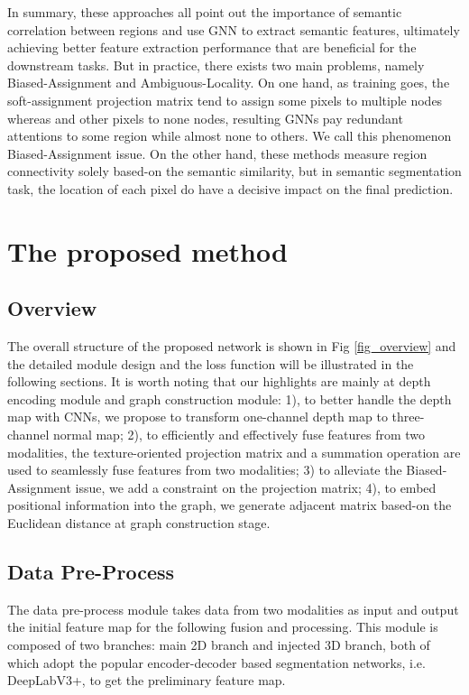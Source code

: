 ﻿\documentclass[journal]{IEEEtran}
\begin{document}
    In summary, these approaches all point out the importance of semantic correlation between regions and use GNN to extract semantic features, ultimately achieving better feature extraction performance that are beneficial for the downstream tasks. But in practice, there exists two main problems, namely Biased-Assignment and Ambiguous-Locality. On one hand, as training goes, the soft-assignment projection matrix tend to assign some pixels to multiple nodes whereas and other pixels to none nodes, resulting GNNs pay redundant attentions to some region while almost none to others. We call this phenomenon Biased-Assignment issue. On the other hand, these methods measure region connectivity   solely based-on the semantic similarity, but in semantic segmentation task, the location of each pixel do have a decisive impact on the final prediction. 

\section{The proposed method}  \label{sec_method}




\subsection{Overview}  \label{sec_sub_overview}
 
    The overall structure of the proposed network is shown in Fig \ref{fig_overview} and the detailed module design and the loss function will be illustrated in the following sections. It is worth noting that our highlights are mainly at depth encoding module and graph construction module: 1), to better handle the depth map with CNNs, we propose to transform one-channel depth map to three-channel normal map; 2), to efficiently and effectively fuse features from two modalities, the texture-oriented projection matrix and a summation operation are used to seamlessly fuse features from two modalities; 3) to alleviate the Biased-Assignment issue, we add a constraint on the projection matrix; 4), to embed positional information into the graph, we generate adjacent matrix based-on the Euclidean distance at graph construction stage. 

\subsection{Data Pre-Process}  \label{sec_sub_depth_process}
 
    The data pre-process module takes data from two modalities as input and output the initial feature map for the following fusion and processing. This module is composed of two branches: main 2D branch and injected 3D branch, both of which adopt the popular encoder-decoder based segmentation networks, i.e. DeepLabV3+, to get the preliminary feature map. 
\end{document}
